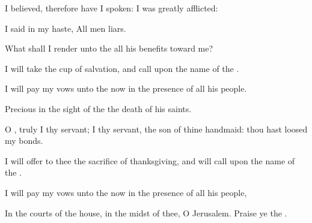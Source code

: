 {\Q {}I
believed, therefore have I
spoken: I was
greatly
afflicted:


\par }{\Q {}I
said in my
haste, All
men
{}
liars.


\par }{\Q {}What shall I
render unto the
{}
{} all his
benefits toward me?


\par }{\Q {}I will
take the
cup of
salvation, and
call upon the
name of the
{}.


\par }{\Q {}I will
pay my
vows unto the
{} now in the presence of all his
people.


\par }{\Q {}Precious in the
sight of the
{}
{} the
death of his
saints.


\par }{\Q {}O
{},
truly I
{} thy
servant; I
{} thy
servant,
{} the
son of thine
handmaid: thou hast
loosed my
bonds.


\par }{\Q {}I will
offer to thee the
sacrifice of
thanksgiving, and will
call upon the
name of the
{}.


\par }{\Q {}I will
pay my
vows unto the
{} now in the presence of all his
people,


\par }{\Q {}In the
courts of the
{}
house, in the
midst of thee, O
Jerusalem.
Praise ye the
{}.




\par }
